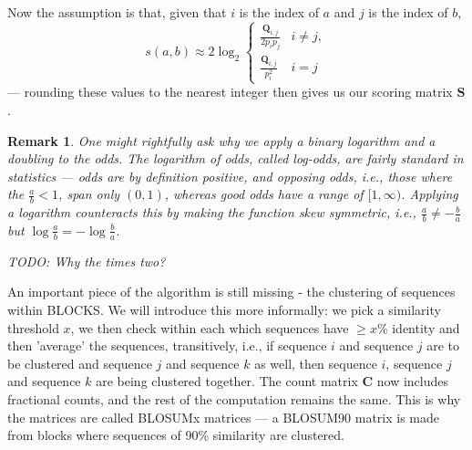 \documentclass{article}
\newtheorem{remark}{Remark}
\begin{document}
Now the assumption is that, given that $i$ is the index of $a$ and $j$ is the index of $b$,
\begin{equation*}
	s(a, b) \approx	2 \log_2 \begin{cases}
		\frac{\mathbf Q_{i, j}}{2p_ip_j} & i \ne j, \\
		\frac{\mathbf Q_{i, j}}{p_i^2} & i = j
	\end{cases}
\end{equation*}
--- rounding these values to the nearest integer then gives us our scoring matrix $\mathbf S$.

\begin{remark}
	One might rightfully ask why we apply a binary logarithm and a doubling to the odds.
	The logarithm of odds, called \emph{log-odds}, are fairly standard in
	statistics --- odds are by definition positive, and opposing odds, i.e.,
	those where the $\frac a b < 1$, span only
	$(0, 1)$, whereas good odds have a range of $[1, \infty)$. Applying a logarithm counteracts
	this by making the function skew symmetric, i.e., $\frac a b 
	\ne -\frac b a$ but $\log \frac a b = - \log \frac b a $.
	
	TODO: Why the times two?
\end{remark}

An important piece of the algorithm is still missing - the clustering of sequences within BLOCKS.
We will introduce this more informally: we pick a similarity threshold $x$, we
then check within each  which sequences have $\ge x$\% identity and
then 'average' the sequences, transitively, i.e., if sequence $i$ and
sequence $j$ are to be clustered and sequence $j$ and sequence $k$ as well,
then sequence $i$, sequence $j$ and sequence $k$ are being clustered together.
The count matrix $\mathbf C$ now includes fractional counts, and the rest of the computation remains the same.
This is why the matrices are called BLOSUMx matrices --- a BLOSUM90 matrix is made from blocks where sequences 
of 90\% similarity are clustered.
\end{document}
